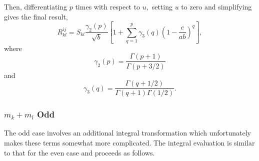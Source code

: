 \documentclass[12pt]{article}
\begin{document}
Then, differentiating $p$ times with respect to $u,$ setting $u$ to zero and
simplifying gives the final result,
\begin{equation}
R_{kl}^{ij}=S_{kl}\frac{\gamma_{2}\left(  p\right)  }{\sqrt{b}}\left[
1+\sum_{q=1}^{p}\gamma_{3}\left(  q\right)  \left(  1-\frac{c}{ab}\right)
^{q}\right]  ,\label{Rkleven}%
\end{equation}
where
\begin{equation}
\gamma_{2}\left(  p\right)  =\frac{\Gamma\left(  p+1\right)  }{\Gamma\left(
p+3/2\right)  }\label{gamma2}%
\end{equation}
and
\begin{equation}
\gamma_{3}\left(  q\right)  =\frac{\Gamma\left(  q+1/2\right)  }{\Gamma\left(
q+1\right)  \Gamma\left(  1/2\right)  }.\label{gamma3}%
\end{equation}

\subsubsection{$m_{k}+m_{l}$ Odd}

The odd case involves an additional integral transformation which
unfortunately makes these terms somewhat more complicated. The integral
evaluation is similar to that for the even case and proceeds as follows.
\end{document}
